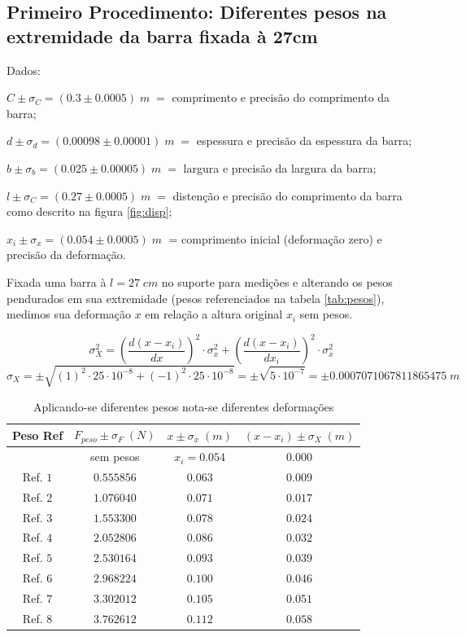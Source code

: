 \documentclass{article}
\begin{document}
\subsection{Primeiro Procedimento: Diferentes pesos na extremidade da barra fixada à 27cm}

Dados:

$C\pm\sigma_C = (0.3\pm0.0005)\;m\;=$ comprimento e precisão do comprimento da barra;

$d\pm\sigma_d = (0.00098\pm0.00001)\;m\;=$ espessura e precisão da espessura da barra;

$b\pm\sigma_b = (0.025\pm0.00005)\;m\;=$ largura e precisão da largura da barra;

$l\pm\sigma_C = (0.27\pm0.0005)\;m\;=$ distenção e precisão do comprimento da barra como descrito na figura \ref{fig:disp};

$x_{i}\pm\sigma_x = (0.054\pm0.0005)\;m\;$ = comprimento inicial (deformação zero) e precisão da deformação.

Fixada uma barra à $l = 27\;cm$ no suporte para medições e alterando os pesos pendurados em sua extremidade (pesos referenciados na tabela \ref{tab:pesos}), medimos sua deformação $x$ em relação a altura original $x_i$ sem pesos.

\[\sigma_X^2 = \left(\frac{d(x-x_i)}{dx}\right)^2\cdot\sigma_x^2 + \left(\frac{d(x-x_i)}{dx_i}\right)^2\cdot\sigma_x^2\]
\[\sigma_X = \pm\sqrt{(1)^2\cdot25\cdot10^{-8} + (-1)^2\cdot25\cdot10^{-8}} = \pm\sqrt{5\cdot10^{-7}} = \pm0.0007071067811865475\;m\]

\begin{table}[!ht]
    \centering
    \begin{tabular}{c c|c|c}
        Peso Ref & $F_{peso}\pm\sigma_F\;(N)$ & $x\pm\sigma_x\;(m)$ & $(x - x_i)\pm\sigma_X\;(m)$\\\hline
        & sem pesos & $x_i = 0.054$ & $0.000$\\
        Ref. $1$ & $0.555856$ & $0.063$ & $0.009$\\
        Ref. $2$ & $1.076040$ & $0.071$ & $0.017$\\
        Ref. $3$ & $1.553300$ & $0.078$ & $0.024$\\
        Ref. $4$ & $2.052806$ & $0.086$ & $0.032$\\
        Ref. $5$ & $2.530164$ & $0.093$ & $0.039$\\
        Ref. $6$ & $2.968224$ & $0.100$ & $0.046$\\
        Ref. $7$ & $3.302012$ & $0.105$ & $0.051$\\
        Ref. $8$ & $3.762612$ & $0.112$ & $0.058$\\
    \end{tabular}
    \caption{Aplicando-se diferentes pesos nota-se diferentes deformações}
    \label{tab:p1}
\end{table}
\end{document}
